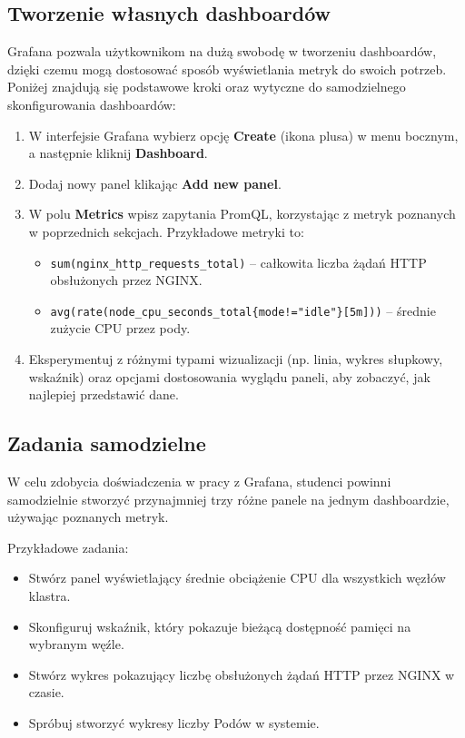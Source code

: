 \documentclass{article}
\begin{document}
\subsection{Tworzenie własnych dashboardów}

Grafana pozwala użytkownikom na dużą swobodę w tworzeniu dashboardów, dzięki czemu mogą dostosować sposób wyświetlania metryk do swoich potrzeb. Poniżej znajdują się podstawowe kroki oraz wytyczne do samodzielnego skonfigurowania dashboardów:

\begin{enumerate}
  \item W interfejsie Grafana wybierz opcję \textbf{Create} (ikona plusa) w menu bocznym, a następnie kliknij \textbf{Dashboard}.
  \item Dodaj nowy panel klikając \textbf{Add new panel}.
  \item W polu \textbf{Metrics} wpisz zapytania PromQL, korzystając z metryk poznanych w poprzednich sekcjach. Przykładowe metryki to:
    \begin{itemize}
    \item \texttt{sum(nginx\_http\_requests\_total)} – całkowita liczba żądań HTTP obsłużonych przez NGINX.
    \item \texttt{avg(rate(node\_cpu\_seconds\_total\{mode!="idle"\}[5m]))} – średnie zużycie CPU przez pody.
  \end{itemize}
  \item Eksperymentuj z różnymi typami wizualizacji (np. linia, wykres słupkowy, wskaźnik) oraz opcjami dostosowania wyglądu paneli, aby zobaczyć, jak najlepiej przedstawić dane.
\end{enumerate}
\subsection{Zadania samodzielne}

W celu zdobycia doświadczenia w pracy z Grafana, studenci powinni samodzielnie stworzyć przynajmniej trzy różne panele na jednym dashboardzie, używając poznanych metryk. 

Przykładowe zadania:
\begin{itemize}
    \item Stwórz panel wyświetlający średnie obciążenie CPU dla wszystkich węzłów klastra.
    \item Skonfiguruj wskaźnik, który pokazuje bieżącą dostępność pamięci na wybranym węźle.
    \item Stwórz wykres pokazujący liczbę obsłużonych żądań HTTP przez NGINX w czasie.
    \item Spróbuj stworzyć wykresy liczby Podów w systemie.
\end{itemize}
\end{document}

